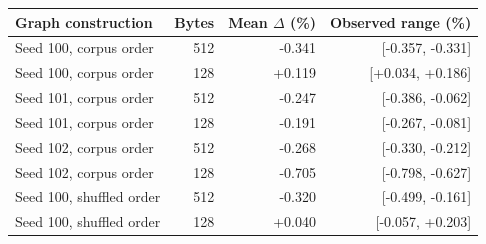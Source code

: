 \begin{tabular}{lrrr}
\toprule
Graph construction & Bytes & Mean $\Delta$ (\%) & Observed range (\%) \\
\midrule
Seed 100, corpus order & 512 & -0.341 & [-0.357, -0.331] \\
Seed 100, corpus order & 128 & +0.119 & [+0.034, +0.186] \\
Seed 101, corpus order & 512 & -0.247 & [-0.386, -0.062] \\
Seed 101, corpus order & 128 & -0.191 & [-0.267, -0.081] \\
Seed 102, corpus order & 512 & -0.268 & [-0.330, -0.212] \\
Seed 102, corpus order & 128 & -0.705 & [-0.798, -0.627] \\
Seed 100, shuffled order & 512 & -0.320 & [-0.499, -0.161] \\
Seed 100, shuffled order & 128 & +0.040 & [-0.057, +0.203] \\
\bottomrule
\end{tabular}
